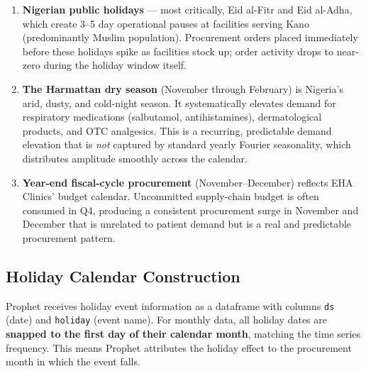 \documentclass[12pt, a4paper]{article}
\begin{document}
\begin{enumerate}[leftmargin=1.5em, itemsep=5pt]
  \item \textbf{Nigerian public holidays} --- most critically, Eid al-Fitr
        and Eid al-Adha, which create 3--5 day operational pauses at
        facilities serving Kano (predominantly Muslim population).
        Procurement orders placed immediately before these holidays spike
        as facilities stock up; order activity drops to near-zero during
        the holiday window itself.

  \item \textbf{The Harmattan dry season} (November through February)
        is Nigeria's arid, dusty, and cold-night season. It systematically
        elevates demand for respiratory medications (salbutamol, antihistamines),
        dermatological products, and OTC analgesics. This is a recurring,
        predictable demand elevation that is \textit{not} captured by
        standard yearly Fourier seasonality, which distributes amplitude
        smoothly across the calendar.

  \item \textbf{Year-end fiscal-cycle procurement} (November--December)
        reflects EHA Clinics' budget calendar. Uncommitted supply-chain
        budget is often consumed in Q4, producing a consistent procurement
        surge in November and December that is unrelated to patient demand
        but is a real and predictable procurement pattern.
\end{enumerate}

\subsection{Holiday Calendar Construction}

Prophet receives holiday event information as a dataframe with columns
\texttt{ds} (date) and \texttt{holiday} (event name). For monthly data,
all holiday dates are \textbf{snapped to the first day of their calendar
month}, matching the time series frequency. This means Prophet attributes
the holiday effect to the procurement month in which the event falls.
\end{document}
